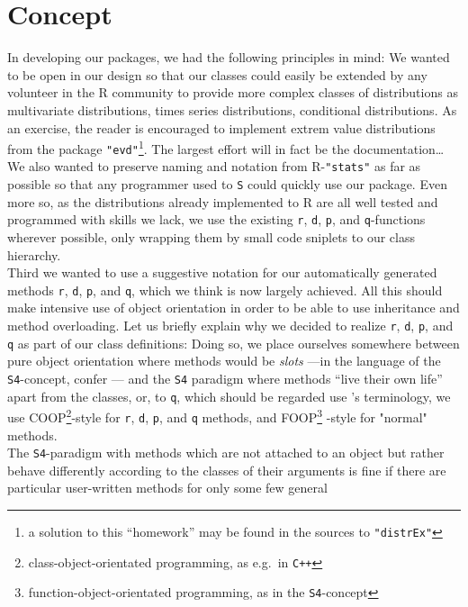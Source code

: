 \documentclass[11pt]{article}
\newcommand{\code}[1]{{\tt #1}}
\newcommand{\pkg}[1]{{\tt "#1"}}
\begin{document}
\section{Concept}
In developing our packages, we had the following principles in mind:
We wanted to be open in our design so that our classes could easily be extended 
by any volunteer in the {\sf R} community to provide more complex classes of 
distributions as multivariate distributions, times series distributions, 
conditional distributions. As an exercise, the reader is encouraged to implement 
extrem value  distributions from the package \pkg{evd}\footnote{a solution to 
this ``homework''  may be found in the sources to \pkg{distrEx}}. The largest 
effort will in fact be the documentation\ldots\\
We also wanted to preserve naming and notation from {\sf R}-\pkg{stats}
as far as possible so that any programmer used to {\tt S} could quickly
use our package. Even more so, as the distributions already implemented to
{\sf R} are all well tested and programmed with skills we lack, we use the
existing {\tt r}, {\tt d}, {\tt p}, and {\tt q}-functions wherever possible,
only wrapping them by small code sniplets to our class hierarchy.\\
Third we wanted to use a suggestive notation for our automatically generated
methods \code{r}, \code{d}, \code{p}, and \code{q}, which we think is now 
largely achieved. All this should make intensive use of object orientation in 
order to be able to use inheritance and method overloading.
Let us briefly explain why we decided to realize \code{r}, \code{d},
\code{p}, and \code{q} as part of our class definitions:
Doing so, we place ourselves somewhere between
pure object orientation where methods would be {\it slots\/} ---in the language 
of the {\tt S4}-concept, confer \cite{Cham:98}--- and the {\tt S4} paradigm 
where methods ``live their own life'' apart from the classes, or, to \code{q}, 
which should be regarded use \cite{Beng:03}'s terminology, we use 
COOP\footnote{class-object-orientated 
programming, as e.g.\ in {\tt C++}}-style for \code{r}, \code{d}, \code{p}, and 
\code{q} methods, and FOOP\footnote{function-object-orientated programming, 
as in the {\tt S4}-concept} -style for "normal" methods.\\
The {\tt S4}-paradigm with methods which are not attached to an object but 
rather behave differently according to the classes of their arguments is fine 
if there are particular user-written methods for only some few general 
\end{document}
